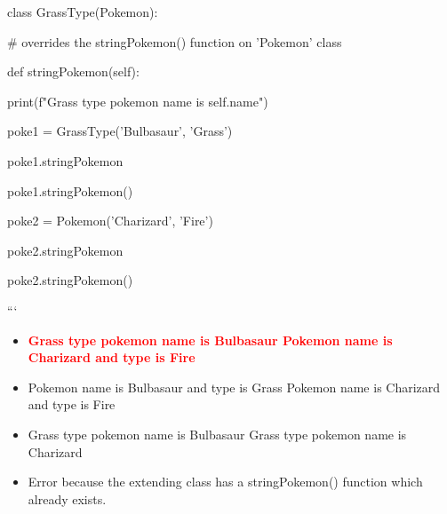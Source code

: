 \documentclass[12pt,a4paper]{article}
\begin{document}
\newline
class GrassType(Pokemon):\newline

\newline
\newline

\newline
    # overrides the stringPokemon() function on 'Pokemon' class\newline

\newline
    def stringPokemon(self):\newline

\newline
        print(f"Grass type pokemon name is self.name")\newline

\newline
\newline

\newline
poke1 = GrassType('Bulbasaur', 'Grass')\newline

\newline
poke1.stringPokemon\newline

\newline
poke1.stringPokemon()\newline

\newline
poke2 = Pokemon('Charizard', 'Fire')\newline

\newline
poke2.stringPokemon\newline

\newline
poke2.stringPokemon()\newline

\newline
```

\begin{itemize}
    \item[\textbf{A.}] \textcolor{red}{\textbf{Grass type pokemon name is Bulbasaur Pokemon name is Charizard and type is Fire}}
    \item[\textbf{B.}] Pokemon name is Bulbasaur and type is Grass Pokemon name is Charizard and type is Fire
    \item[\textbf{C.}] Grass type pokemon name is Bulbasaur Grass type pokemon name is Charizard
    \item[\textbf{D.}] Error because the extending class has a stringPokemon() function which already exists.
\end{itemize}
\end{document}
